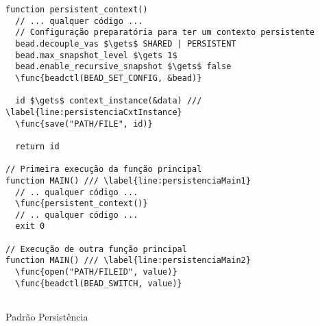 \begin{pseudocode}
\begin{lstlisting}[language=pseudocode, style=pseudocode]
function persistent_context()
  // ... qualquer código ...
  // Configuração preparatória para ter um contexto persistente
  bead.decouple_vas $\gets$ SHARED | PERSISTENT
  bead.max_snapshot_level $\gets 1$
  bead.enable_recursive_snapshot $\gets$ false
  \func{beadctl(BEAD_SET_CONFIG, &bead)}

  id $\gets$ context_instance(&data) /// \label{line:persistenciaCxtInstance}
  \func{save("PATH/FILE", id)}

  return id

// Primeira execução da função principal
function MAIN() /// \label{line:persistenciaMain1}
  // .. qualquer código ...
  \func{persistent_context()}
  // .. qualquer código ...
  exit 0

// Execução de outra função principal
function MAIN() /// \label{line:persistenciaMain2}
  \func{open("PATH/FILEID", value)}
  \func{beadctl(BEAD_SWITCH, value)}
  
\end{lstlisting}

  \caption{Padrão Persistência}
  \label{alg:persistencia}
\end{pseudocode}
